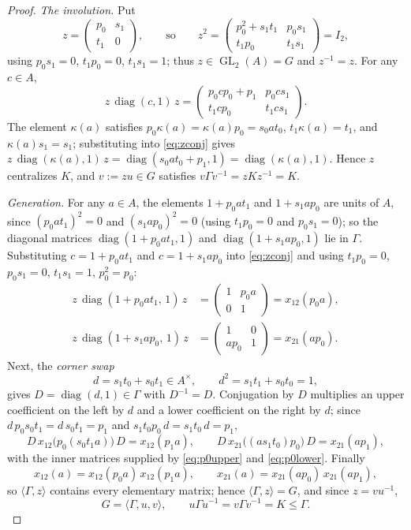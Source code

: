 \documentclass[11pt]{amsart}
\theoremstyle{definition}
\theoremstyle{plain}
\newcommand{\GL}{\operatorname{GL}}
\DeclareMathOperator{\diag}{diag}
\begin{document}
\begin{proof}
\emph{The involution.}  Put
\[
 z=\begin{pmatrix}p_0&s_1\\ t_1&0\end{pmatrix},
 \qquad\text{so}\qquad
 z^2=\begin{pmatrix}p_0^2+s_1t_1&p_0s_1\\ t_1p_0&t_1s_1\end{pmatrix}=I_2,
\]
using \(p_0s_1=0\), \(t_1p_0=0\), \(t_1s_1=1\); thus \(z\in\GL_2(A)=G\) and \(z^{-1}=z\).  For any \(c\in A\),
\begin{equation}\label{eq:zconj}
 z\,\diag(c,1)\,z
 =\begin{pmatrix}p_0cp_0+p_1&p_0cs_1\\ t_1cp_0&t_1cs_1\end{pmatrix}.
\end{equation}
The element \(\kappa(a)\) satisfies \(p_0\kappa(a)=\kappa(a)p_0=s_0at_0\), \(t_1\kappa(a)=t_1\), and \(\kappa(a)s_1=s_1\); substituting into \eqref{eq:zconj} gives \(z\,\diag(\kappa(a),1)\,z=\diag(s_0at_0+p_1,1)=\diag(\kappa(a),1)\).  Hence \(z\) centralizes \(K\), and \(v:=zu\in G\) satisfies \(v\Gamma v^{-1}=zKz^{-1}=K\).

\emph{Generation.}  For any \(a\in A\), the elements \(1+p_0at_1\) and \(1+s_1ap_0\) are units of \(A\), since \((p_0at_1)^2=0\) and \((s_1ap_0)^2=0\) (using \(t_1p_0=0\) and \(p_0s_1=0\)); so the diagonal matrices \(\diag(1+p_0at_1,1)\) and \(\diag(1+s_1ap_0,1)\) lie in \(\Gamma\).  Substituting \(c=1+p_0at_1\) and \(c=1+s_1ap_0\) into \eqref{eq:zconj} and using \(t_1p_0=0\), \(p_0s_1=0\), \(t_1s_1=1\), \(p_0^2=p_0\):
\begin{align}
 z\,\diag(1+p_0at_1,\,1)\,z&=\begin{pmatrix}1&p_0a\\ 0&1\end{pmatrix}=x_{12}(p_0a),\label{eq:p0upper}\\
 z\,\diag(1+s_1ap_0,\,1)\,z&=\begin{pmatrix}1&0\\ ap_0&1\end{pmatrix}=x_{21}(ap_0).\label{eq:p0lower}
\end{align}
Next, the \emph{corner swap}
\[
 d=s_1t_0+s_0t_1\in A^\times,
 \qquad
 d^2=s_1t_1+s_0t_0=1,
\]
gives \(D=\diag(d,1)\in\Gamma\) with \(D^{-1}=D\).  Conjugation by \(D\) multiplies an upper coefficient on the left by \(d\) and a lower coefficient on the right by \(d\); since \(d\,p_0s_0t_1=d\,s_0t_1=p_1\) and \(s_1t_0p_0\,d=s_1t_0\,d=p_1\),
\[
 D\,x_{12}\bigl(p_0(s_0t_1a)\bigr)\,D=x_{12}(p_1a),
 \qquad
 D\,x_{21}\bigl((as_1t_0)p_0\bigr)\,D=x_{21}(ap_1),
\]
with the inner matrices supplied by \eqref{eq:p0upper} and \eqref{eq:p0lower}.  Finally
\[
 x_{12}(a)=x_{12}(p_0a)\,x_{12}(p_1a),
 \qquad
 x_{21}(a)=x_{21}(ap_0)\,x_{21}(ap_1),
\]
so \(\langle\Gamma,z\rangle\) contains every elementary matrix; hence \(\langle\Gamma,z\rangle=G\), and since \(z=vu^{-1}\),
\[
 G=\langle\Gamma,u,v\rangle,
 \qquad
 u\Gamma u^{-1}=v\Gamma v^{-1}=K\leq\Gamma .
\]


\end{proof}
\end{document}
